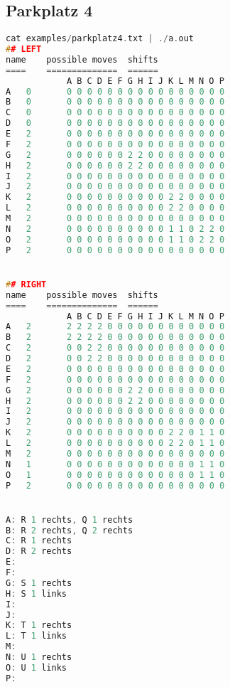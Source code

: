 \documentclass[a4paper,10pt,ngerman]{scrartcl}
\begin{document}
\subsection*{Parkplatz 4}
\begin{lstlisting}[language=C++]
cat examples/parkplatz4.txt | ./a.out
## LEFT
name	possible moves	shifts
====	==============	======
			A B C D E F G H I J K L M N O P
A	0		0 0 0 0 0 0 0 0 0 0 0 0 0 0 0 0
B	0		0 0 0 0 0 0 0 0 0 0 0 0 0 0 0 0
C	0		0 0 0 0 0 0 0 0 0 0 0 0 0 0 0 0
D	0		0 0 0 0 0 0 0 0 0 0 0 0 0 0 0 0
E	2		0 0 0 0 0 0 0 0 0 0 0 0 0 0 0 0
F	2		0 0 0 0 0 0 0 0 0 0 0 0 0 0 0 0
G	2		0 0 0 0 0 0 2 2 0 0 0 0 0 0 0 0
H	2		0 0 0 0 0 0 2 2 0 0 0 0 0 0 0 0
I	2		0 0 0 0 0 0 0 0 0 0 0 0 0 0 0 0
J	2		0 0 0 0 0 0 0 0 0 0 0 0 0 0 0 0
K	2		0 0 0 0 0 0 0 0 0 0 2 2 0 0 0 0
L	2		0 0 0 0 0 0 0 0 0 0 2 2 0 0 0 0
M	2		0 0 0 0 0 0 0 0 0 0 0 0 0 0 0 0
N	2		0 0 0 0 0 0 0 0 0 0 1 1 0 2 2 0
O	2		0 0 0 0 0 0 0 0 0 0 1 1 0 2 2 0
P	2		0 0 0 0 0 0 0 0 0 0 0 0 0 0 0 0


## RIGHT
name	possible moves	shifts
====	==============	======
			A B C D E F G H I J K L M N O P
A	2		2 2 2 2 0 0 0 0 0 0 0 0 0 0 0 0
B	2		2 2 2 2 0 0 0 0 0 0 0 0 0 0 0 0
C	2		0 0 2 2 0 0 0 0 0 0 0 0 0 0 0 0
D	2		0 0 2 2 0 0 0 0 0 0 0 0 0 0 0 0
E	2		0 0 0 0 0 0 0 0 0 0 0 0 0 0 0 0
F	2		0 0 0 0 0 0 0 0 0 0 0 0 0 0 0 0
G	2		0 0 0 0 0 0 2 2 0 0 0 0 0 0 0 0
H	2		0 0 0 0 0 0 2 2 0 0 0 0 0 0 0 0
I	2		0 0 0 0 0 0 0 0 0 0 0 0 0 0 0 0
J	2		0 0 0 0 0 0 0 0 0 0 0 0 0 0 0 0
K	2		0 0 0 0 0 0 0 0 0 0 2 2 0 1 1 0
L	2		0 0 0 0 0 0 0 0 0 0 2 2 0 1 1 0
M	2		0 0 0 0 0 0 0 0 0 0 0 0 0 0 0 0
N	1		0 0 0 0 0 0 0 0 0 0 0 0 0 1 1 0
O	1		0 0 0 0 0 0 0 0 0 0 0 0 0 1 1 0
P	2		0 0 0 0 0 0 0 0 0 0 0 0 0 0 0 0


A: R 1 rechts, Q 1 rechts
B: R 2 rechts, Q 2 rechts
C: R 1 rechts
D: R 2 rechts
E:
F:
G: S 1 rechts
H: S 1 links
I:
J:
K: T 1 rechts
L: T 1 links
M:
N: U 1 rechts
O: U 1 links
P:
\end{lstlisting}
\end{document}
